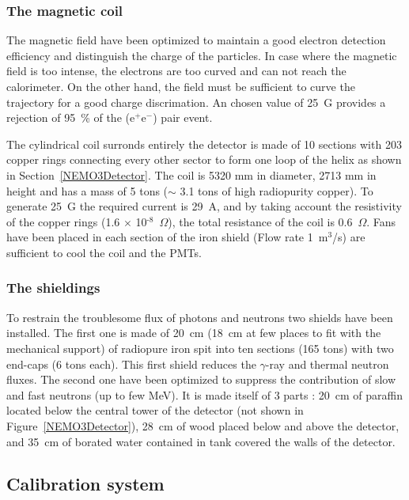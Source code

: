 \documentclass[main.tex]{subfiles}
\begin{document}
\subsubsection{The magnetic coil}


\NI The magnetic field have been optimized to maintain a good electron detection efficiency and distinguish the charge of the particles. In case where the magnetic field is too intense, the electrons are too curved and can not reach the calorimeter. On the other hand, the field must be sufficient to curve the trajectory for a good charge discrimation. An chosen value of 25~G provides a rejection of 95~\% of the (e$^+$e$^-$) pair event.


\bigskip


\NI The cylindrical coil surronds entirely the detector is made of 10 sections with 203 copper rings connecting every other sector to form one loop of the helix as shown in Section~\ref{NEMO3Detector}. The coil is 5320 mm in diameter, 2713 mm in height and has a mass of 5 tons ($\sim$ 3.1 tons of high radiopurity copper). To generate 25~G the required current is 29~A, and by taking account the resistivity of the copper rings (1.6 $\times$ 10$^{\text{-8}}$~$\Omega$), the total resistance of the coil is 0.6~$\Omega$. Fans have been placed in each section of the iron shield (Flow rate 1~m$^\text{3}$/s) are sufficient to cool the coil and the PMTs.



\subsubsection{The shieldings}


\NI To restrain the troublesome flux of photons and neutrons two shields have been installed. The first one is made of 20~cm (18~cm at few places to fit with the mechanical support) of radiopure iron spit into ten sections (165 tons) with two end-caps (6 tons each). This first shield reduces the $\gamma$-ray and thermal neutron fluxes. The second one have been optimized to suppress the contribution of slow and fast neutrons (up to few MeV). It is made itself of 3 parts :  20~cm of paraffin located below the central tower of the detector (not shown in Figure~\ref{NEMO3Detector}), 28~cm of wood placed below and above the detector, and 35~cm of borated water contained in tank covered the walls of the detector.  



\subsection{Calibration system}
\end{document}
